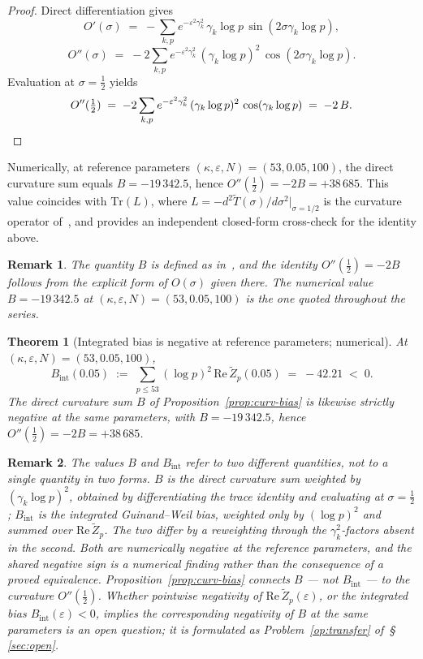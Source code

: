 \documentclass[11pt]{article}
\newtheorem{theorem}{Theorem}[section]
\newtheorem*{remark}{Remark}
\newcommand{\Tt}{\widetilde{T}}
\newcommand{\Zt}{\widetilde{Z}}
\begin{document}
\begin{proof}
Direct differentiation gives
\[
O'(\sigma) \;=\; -\sum_{k,p} e^{-\varepsilon^2\gamma_k^2}\,\gamma_k\log p\,
                \sin(2\sigma\gamma_k\log p),
\]
\[
O''(\sigma) \;=\; -2\sum_{k,p} e^{-\varepsilon^2\gamma_k^2}\,
                (\gamma_k\log p)^2\,\cos(2\sigma\gamma_k\log p).
\]
Evaluation at $\sigma=\tfrac12$ yields
\[
O''(\tfrac12) \;=\; -2\sum_{k,p} e^{-\varepsilon^2\gamma_k^2}\,
                (\gamma_k\log p)^2\,\cos(\gamma_k\log p) \;=\; -2\,B.
\qedhere
\]
\end{proof}

Numerically, at reference parameters $(\kappa,\varepsilon,N)=(53,0.05,100)$,
the direct curvature sum equals $B=-19\,342.5$, hence
$O''(\tfrac12)=-2B=+38\,685$.
This value coincides with $\mathrm{Tr}(L)$, where
$L=-d^2\Tt(\sigma)/d\sigma^2\big|_{\sigma=1/2}$ is the curvature
operator of~\cite{Paper5}, and provides an independent closed-form
cross-check for the identity above.

\begin{remark}
The quantity $B$ is defined as in~\cite[\S5]{Paper5}, and the identity
$O''(\tfrac12)=-2B$ follows from the explicit form of $O(\sigma)$
given there.
The numerical value $B=-19\,342.5$ at $(\kappa,\varepsilon,N)=(53,0.05,100)$
is the one quoted throughout the series.
\end{remark}

\begin{theorem}[Integrated bias is negative at reference parameters; numerical]
\label{thm:intbias}
At $(\kappa,\varepsilon,N)=(53,0.05,100)$,
\[
B_{\mathrm{int}}(0.05) \;:=\; \sum_{p\le 53}(\log p)^2\,
\mathrm{Re}\,\Zt_p(0.05) \;=\; -42.21 \;<\; 0.
\]
The direct curvature sum $B$ of Proposition~\ref{prop:curv-bias} is
likewise strictly negative at the same parameters, with
$B=-19\,342.5$, hence $O''(\tfrac12)=-2B=+38\,685$.
\end{theorem}

\begin{remark}
The values $B$ and $B_{\mathrm{int}}$ refer to two \emph{different}
quantities, not to a single quantity in two forms.
$B$ is the direct curvature sum weighted by $(\gamma_k\log p)^2$,
obtained by differentiating the trace identity and evaluating at
$\sigma=\tfrac12$; $B_{\mathrm{int}}$ is the integrated Guinand--Weil
bias, weighted only by $(\log p)^2$ and summed over
$\mathrm{Re}\,\Zt_p$.
The two differ by a reweighting through the $\gamma_k^2$-factors
absent in the second.
Both are numerically negative at the reference parameters, and the
shared negative sign is a numerical finding rather than the consequence
of a proved equivalence.
Proposition~\ref{prop:curv-bias} connects $B$ --- not $B_{\mathrm{int}}$
--- to the curvature $O''(\tfrac12)$.
Whether pointwise negativity of $\mathrm{Re}\,\Zt_p(\varepsilon)$, or
the integrated bias $B_{\mathrm{int}}(\varepsilon)<0$, implies the
corresponding negativity of $B$ at the same parameters is an open
question; it is formulated as Problem~\ref{op:transfer} of~\S\,\ref{sec:open}.
\end{remark}
\end{document}
